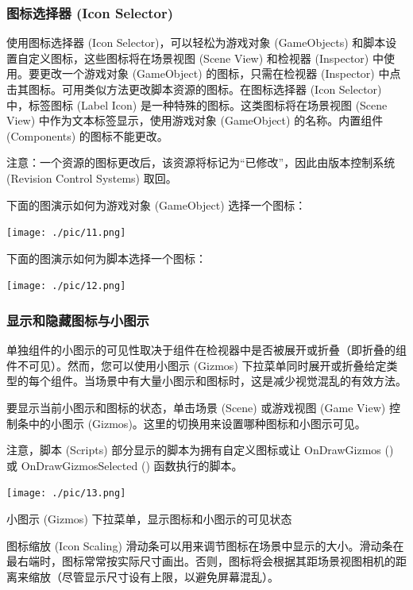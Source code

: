 \documentclass[9pt, b5paper]{article}
\begin{document}
\subsubsection{图标选择器 (Icon Selector)}
\label{sec:orgdf111bf}

使用图标选择器 (Icon Selector)，可以轻松为游戏对象 (GameObjects) 和脚本设置自定义图标，这些图标将在场景视图 (Scene View) 和检视器 (Inspector) 中使用。要更改一个游戏对象 (GameObject) 的图标，只需在检视器 (Inspector) 中点击其图标。可用类似方法更改脚本资源的图标。在图标选择器 (Icon Selector) 中，标签图标 (Label Icon) 是一种特殊的图标。这类图标将在场景视图 (Scene View) 中作为文本标签显示，使用游戏对象 (GameObject) 的名称。内置组件 (Components) 的图标不能更改。

注意：一个资源的图标更改后，该资源将标记为“已修改”，因此由版本控制系统 (Revision Control Systems) 取回。

下面的图演示如何为游戏对象 (GameObject) 选择一个图标：

\begin{center}
\texttt{[image: ./pic/11.png]}
\end{center}

下面的图演示如何为脚本选择一个图标：

\begin{center}
\texttt{[image: ./pic/12.png]}
\end{center}
\subsubsection{显示和隐藏图标与小图示}
\label{sec:orga3ef069}

单独组件的小图示的可见性取决于组件在检视器中是否被展开或折叠（即折叠的组件不可见）。然而，您可以使用小图示 (Gizmos) 下拉菜单同时展开或折叠给定类型的每个组件。当场景中有大量小图示和图标时，这是减少视觉混乱的有效方法。

要显示当前小图示和图标的状态，单击场景 (Scene) 或游戏视图 (Game View) 控制条中的小图示 (Gizmos)。这里的切换用来设置哪种图标和小图示可见。

注意，脚本 (Scripts) 部分显示的脚本为拥有自定义图标或让 OnDrawGizmos () 或 OnDrawGizmosSelected () 函数执行的脚本。

\begin{center}
\texttt{[image: ./pic/13.png]}
\end{center}

小图示 (Gizmos) 下拉菜单，显示图标和小图示的可见状态

图标缩放 (Icon Scaling) 滑动条可以用来调节图标在场景中显示的大小。滑动条在最右端时，图标常常按实际尺寸画出。否则，图标将会根据其距场景视图相机的距离来缩放（尽管显示尺寸设有上限，以避免屏幕混乱）。
\end{document}
